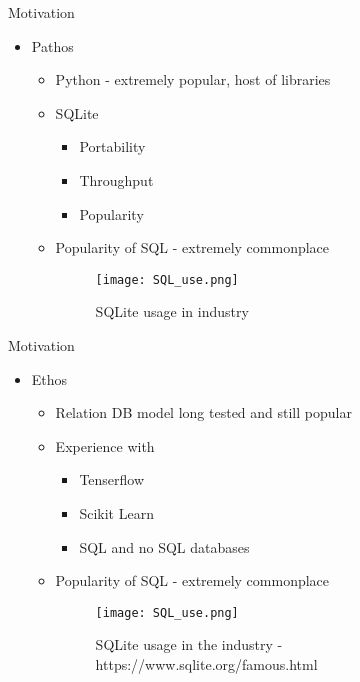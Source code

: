 \documentclass{beamer}
\begin{document}
\begin{frame}{Motivation}{}
  \begin{itemize}
  \item<1-> {
   Pathos
   \begin{itemize}
       \item<1->  Python - extremely popular, host of libraries
       \vspace{.2in}
       \item<2-> SQLite
        \begin{itemize}
            \item<3-> Portability 
            \item<4-> Throughput
            \item<5-> Popularity
        \end{itemize}
        \vspace{.2in}
       \item<6-> Popularity of SQL - extremely commonplace
       \begin{figure}
           \centering
           \texttt{[image: SQL\_use.png]}
           \caption{SQLite usage in industry}
           \label{fig:sql_prev}
       \end{figure}
   \end{itemize}
  }

  \end{itemize}
\end{frame}

\begin{frame}{Motivation}{}
  \begin{itemize}
  \item<1-> {
   Ethos
   \begin{itemize}
       \item<1->  Relation DB model long tested and still popular
       \vspace{.2in}
       \item<2-> Experience with 
        \begin{itemize}
            \item<3-> Tenserflow 
            \item<4-> Scikit Learn
            \item<5-> SQL and no SQL databases
        \end{itemize}
        \vspace{.2in}
       \item<6-> Popularity of SQL - extremely commonplace
       \begin{figure}
           \centering
           \texttt{[image: SQL\_use.png]}
           \caption{SQLite usage in the industry - https://www.sqlite.org/famous.html}
           \label{fig:sql_industry}
       \end{figure}
   \end{itemize}
  }

  \end{itemize}
\end{frame}
\end{document}

